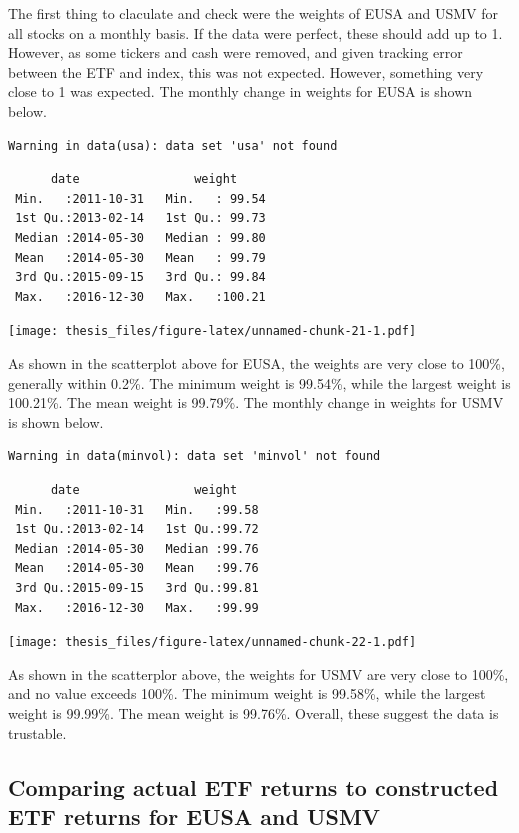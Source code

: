 \documentclass[12pt,twoside]{reedthesis}
\theoremstyle{definition}
\theoremstyle{definition}
\theoremstyle{definition}
\theoremstyle{remark}
\begin{document}
The first thing to claculate and check were the weights of EUSA and USMV
for all stocks on a monthly basis. If the data were perfect, these
should add up to 1. However, as some tickers and cash were removed, and
given tracking error between the ETF and index, this was not expected.
However, something very close to 1 was expected. The monthly change in
weights for EUSA is shown below.
\begin{verbatim}
Warning in data(usa): data set 'usa' not found
\end{verbatim}
\begin{verbatim}
      date                weight      
 Min.   :2011-10-31   Min.   : 99.54  
 1st Qu.:2013-02-14   1st Qu.: 99.73  
 Median :2014-05-30   Median : 99.80  
 Mean   :2014-05-30   Mean   : 99.79  
 3rd Qu.:2015-09-15   3rd Qu.: 99.84  
 Max.   :2016-12-30   Max.   :100.21  
\end{verbatim}
\texttt{[image: thesis\_files/figure-latex/unnamed-chunk-21-1.pdf]}

As shown in the scatterplot above for EUSA, the weights are very close
to 100\%, generally within 0.2\%. The minimum weight is 99.54\%, while
the largest weight is 100.21\%. The mean weight is 99.79\%. The monthly
change in weights for USMV is shown below.
\begin{verbatim}
Warning in data(minvol): data set 'minvol' not found
\end{verbatim}
\begin{verbatim}
      date                weight     
 Min.   :2011-10-31   Min.   :99.58  
 1st Qu.:2013-02-14   1st Qu.:99.72  
 Median :2014-05-30   Median :99.76  
 Mean   :2014-05-30   Mean   :99.76  
 3rd Qu.:2015-09-15   3rd Qu.:99.81  
 Max.   :2016-12-30   Max.   :99.99  
\end{verbatim}
\texttt{[image: thesis\_files/figure-latex/unnamed-chunk-22-1.pdf]}

As shown in the scatterplor above, the weights for USMV are very close
to 100\%, and no value exceeds 100\%. The minimum weight is 99.58\%,
while the largest weight is 99.99\%. The mean weight is 99.76\%.
Overall, these suggest the data is trustable.

\subsection{Comparing actual ETF returns to constructed ETF returns for
EUSA and
USMV}\label{comparing-actual-etf-returns-to-constructed-etf-returns-for-eusa-and-usmv}
\end{document}
